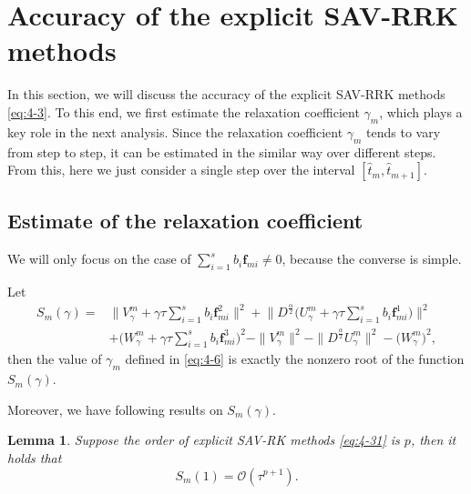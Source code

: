\documentclass[preprint,compress,3p,10pt,fleqn]{elsarticle}
\numberwithin{equation}{section}
\newtheorem{lemma}[theorem]{Lemma}
\begin{document}
\section{Accuracy of the explicit SAV-RRK methods}\label{Section 5}
In this section, we will discuss the accuracy of the explicit SAV-RRK methods \eqref{eq:4-3}. To this end, we first estimate the relaxation coefficient $\gamma_m$, which plays a key role in the next analysis.
Since the relaxation coefficient $\gamma_m$ tends to vary from step to step, it can be estimated in the similar way over different steps. From this, here we just consider a single step over the interval $\left[\hat{t}_m, \hat{t}_{m+1}\right]$.

\subsection{Estimate of the relaxation coefficient}\label{Section 5-1}

We will only focus on the case of $\sum\limits_{i=1}^s b_i \bm{f}_{m i} \neq 0$, because the converse is simple.

Let
\begin{equation}
\begin{aligned}\label{eq:sm}
S_m(\gamma)=&\big\|V_\gamma^m+\gamma \tau \sum\limits_{i=1}^s b_i \bm{f}_{m i}^2\big\|^2 + \big\|D^\frac{\alpha}{2} \big(U_\gamma^m+\gamma \tau \sum\limits_{i=1}^s b_i \bm{f}_{m i}^1\big)\big\|^2\\
&+\big(W_\gamma^m+\gamma \tau \sum\limits_{i=1}^s b_i \bm{f}_{m i}^3\big)^2-\|V_\gamma^{m}\|^2 - \|D^\frac{\alpha}{2} U_\gamma^{m}\|^2-\big(W_\gamma^{m}\big)^2,
\end{aligned}
\end{equation}
then the value of $\gamma_m$ defined in \eqref{eq:4-6} is exactly the nonzero root of the function $S_m(\gamma)$.

    Moreover, we have following results on $S_m(\gamma)$.
\begin{lemma}\label{lem:5_1}
Suppose the order of explicit SAV-RK methods \eqref{eq:4-31} is $p$, then it holds that
\begin{equation}
S_m(1)=\mathcal{O}(\tau^{p+1}).
\end{equation}
\end{lemma}
\end{document}
